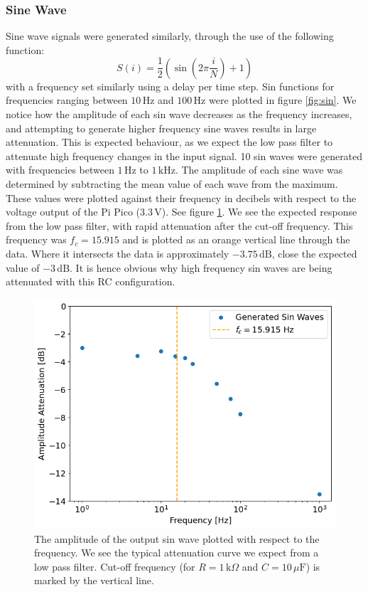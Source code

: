 \documentclass[%
 reprint,
 amsmath,amssymb,
 aps,
]{revtex4-2}
\begin{document}
        \subsubsection{Sine Wave}
        
        Sine wave signals were generated similarly, through the use of the following function:
        \begin{equation}
            S(i) = \frac{1}{2}\left(\sin\left(2\pi\frac{i}{N}\right) + 1\right)
        \end{equation}with a frequency set similarly using a delay per time step. Sin functions for frequencies ranging between $10\,\text{Hz}$ and $100\,\text{Hz}$ were plotted in figure \ref{fig:sin}. We notice how the amplitude of each sin wave decreases as the frequency increases, and attempting to generate higher frequency sine waves results in large attenuation. This is expected behaviour, as we expect the low pass filter to attenuate high frequency changes in the input signal. 10 sin waves were generated with frequencies between $1\,\text{Hz}$ to $1\,\text{kHz}$. The amplitude of each sine wave was determined by subtracting the mean value of each wave from the maximum. These values were plotted against their frequency in decibels with respect to the voltage output of the Pi Pico ($3.3\,\text{V}$). See figure \ref{fig:attenuation}. We see the expected response from the low pass filter, with rapid attenuation after the cut-off frequency. This frequency was $f_c = 15.915$ and is plotted as an orange vertical line through the data. Where it intersects the data is approximately $-3.75\,\text{dB}$, close the expected value of $-3\,\text{dB}$. It is hence obvious why high frequency sin waves are being attenuated with this RC configuration.

        \begin{figure}
            \includegraphics[width=0.9\columnwidth]{Images/attenuation.png}
            \caption{\label{fig:attenuation}The amplitude of the output sin wave plotted with respect to the frequency. We see the typical attenuation curve we expect from a low pass filter. Cut-off frequency (for $R=1\,\text{k}\Omega$ and $C=10\,\mu\text{F}$) is marked by the vertical line.}
        \end{figure}
\end{document}
